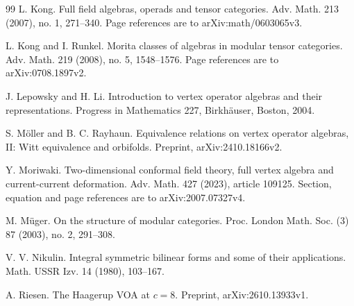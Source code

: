 \documentclass[leqno]{article}
\numberwithin{equation}{section}
\begin{document}
\begin{thebibliography}{99}
L. Kong.
\newblock Full field algebras, operads and tensor categories.
\newblock Adv. Math. 213 (2007), no. 1, 271--340. Page references are to arXiv:math/0603065v3.

L. Kong and I. Runkel.
\newblock Morita classes of algebras in modular tensor categories.
\newblock Adv. Math. 219 (2008), no. 5, 1548--1576. Page references are to arXiv:0708.1897v2.

J. Lepowsky and H. Li.
\newblock Introduction to vertex operator algebras and their representations.
\newblock Progress in Mathematics 227, Birkhäuser, Boston, 2004.

S. Möller and B. C. Rayhaun.
\newblock Equivalence relations on vertex operator algebras, II: Witt equivalence and orbifolds.
\newblock Preprint, arXiv:2410.18166v2.

Y. Moriwaki.
\newblock Two-dimensional conformal field theory, full vertex algebra and current-current deformation.
\newblock Adv. Math. 427 (2023), article 109125. Section, equation and page references are to arXiv:2007.07327v4.

M. Müger.
\newblock On the structure of modular categories.
\newblock Proc. London Math. Soc. (3) 87 (2003), no. 2, 291--308.

V. V. Nikulin.
\newblock Integral symmetric bilinear forms and some of their applications.
\newblock Math. USSR Izv. 14 (1980), 103--167.

A. Riesen.
\newblock The Haagerup VOA at $c = 8$.
\newblock Preprint, arXiv:2610.13933v1.

\end{thebibliography}
\end{document}
